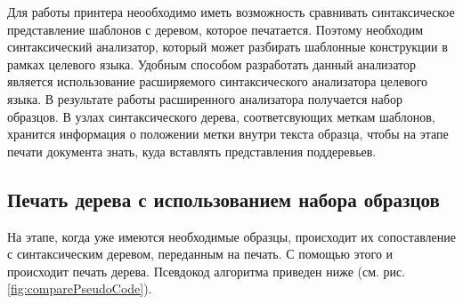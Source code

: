 Для работы принтера неообходимо иметь возможность сравнивать синтаксическое представление шаблонов с деревом, которое печатается. Поэтому необходим синтаксический анализатор, который может разбирать шаблонные конструкции в рамках целевого языка. Удобным способом разработать данный анализатор является использование расширяемого синтаксического анализатора целевого языка. В результате работы расширенного анализатора получается набор образцов. В узлах синтаксического дерева, соответсвующих меткам шаблонов, хранится информация о положении метки внутри текста образца, чтобы на этапе печати документа знать, куда вставлять представления поддеревьев.

\newpage

\subsection{Печать дерева с использованием набора образцов}

На этапе, когда уже имеются необходимые образцы, происходит их сопоставление с синтаксическим деревом, переданным на печать. С помощью этого и происходит печать дерева.
Псевдокод алгоритма приведен ниже (см. рис. \ref{fig:comparePseudoCode}).

